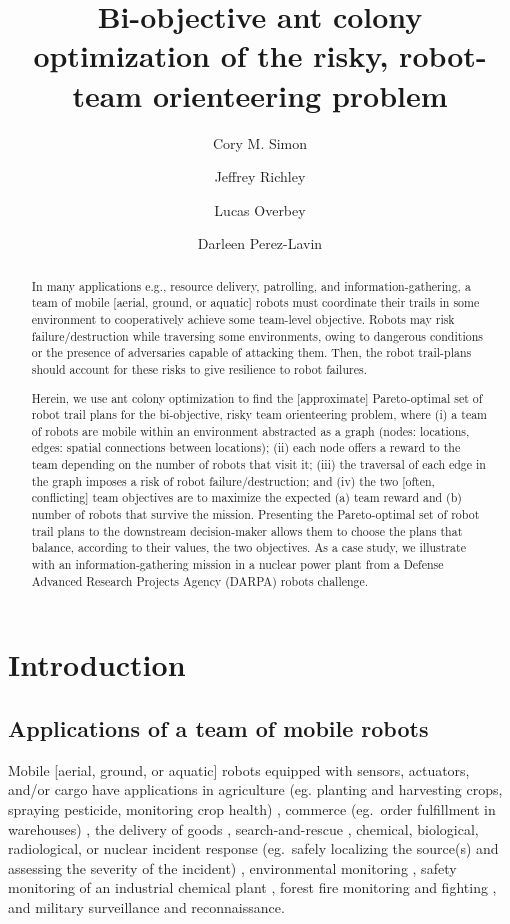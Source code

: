 \documentclass[11pt, oneside]{article}
\title{Bi-objective ant colony optimization of the risky, robot-team orienteering problem}
\author[1]{Cory M. Simon}
\author[2]{Jeffrey Richley}
\author[2]{Lucas Overbey}
\author[2]{Darleen Perez-Lavin}
\affil[1]{School of Chemical, Biological, and Environmental Engineering. Oregon State University. Corvallis, OR. USA.}
\affil[2]{Naval Information Warfare Center Atlantic. Charleston, SC. USA.}
\begin{document}
\maketitle

\begin{abstract}
In many applications e.g., resource delivery, patrolling, and information-gathering, a team of mobile [aerial, ground, or aquatic] robots must coordinate their trails in some environment to cooperatively achieve some team-level objective. Robots may risk failure/destruction while traversing some environments, owing to dangerous conditions or the presence of adversaries capable of attacking them. Then, the robot trail-plans should account for these risks to give resilience to robot failures.

Herein, we use ant colony optimization to find the [approximate] Pareto-optimal set of robot trail plans for the bi-objective, risky team orienteering problem, where (i) a team of robots are mobile within an environment abstracted as a graph (nodes: locations, edges: spatial connections between locations); (ii) each node offers a reward to the team depending on the number of robots that visit it; (iii) the traversal of each edge in the graph imposes a risk of robot failure/destruction; and (iv) the two [often, conflicting] team objectives are to maximize the expected (a) team reward and (b) number of robots that survive the mission. 
Presenting the Pareto-optimal set of robot trail plans to the downstream decision-maker allows them to choose the plans that balance, according to their values, the two objectives. As a case study, we illustrate with an information-gathering mission in a nuclear power plant from a Defense Advanced Research Projects Agency (DARPA) robots challenge.
\end{abstract}

\clearpage


\section{Introduction}
\subsection{Applications of a team of mobile robots}
Mobile [aerial, ground, or aquatic] robots equipped with sensors, actuators, and/or cargo have applications in agriculture (eg. planting and harvesting crops, spraying pesticide, monitoring crop health) \cite{santos2020path}, commerce (eg.\ order fulfillment in warehouses) \cite{wurman2008coordinating}, the delivery of goods \cite{coelho2014thirty}, search-and-rescue \cite{queralta2020collaborative}, chemical, biological, radiological, or nuclear incident response (eg.\ safely localizing the source(s) and assessing the severity of the incident) \cite{murphy2012projected}, environmental monitoring \cite{dunbabin2012robots}, safety monitoring of an industrial chemical plant  \cite{soldan2014towards}, forest fire monitoring and fighting \cite{merino2012unmanned}, and military surveillance and reconnaissance. 
\end{document}
